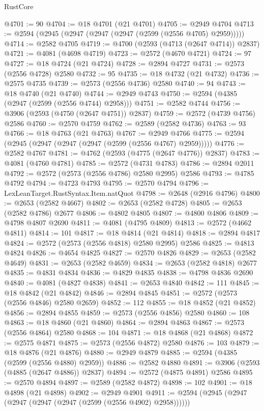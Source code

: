 \begin{lexlean}{RustCore}
\begin{coremodule}
@4701 := 90
@4704 := @18 @4701 (@21 @4701)
@4705 := @2949 @4704
@4713 := @2594 (@2945 (@2947 (@2947 (@2947 (@2599 (@2556 @4705) @2959)))))
@4714 := @2582 @4705
@4719 := @4700 (@2593 (@4713 (@2647 @4714)) @2837)
@4721 := @4081 (@4698 @4719)
@4723 := @2572 (@4670 @4721)
@4724 := 97
@4727 := @18 @4724 (@21 @4724)
@4728 := @2894 @4727
@4731 := @2573 (@2556 @4728) @2580
@4732 := 95
@4735 := @18 @4732 (@21 @4732)
@4736 := @2575 @4735
@4739 := @2573 (@2556 @4736) @2580
@4740 := 94
@4743 := @18 @4740 (@21 @4740)
@4744 := @2949 @4743
@4750 := @2594 (@4385 (@2947 (@2599 (@2556 @4744) @2958)))
@4751 := @2582 @4744
@4756 := @3906 (@2593 (@4750 (@2647 @4751)) @2837)
@4759 := @2572 (@4739 @4756) @2586
@4760 := @2570 @4759
@4762 := @2589 (@2582 @4736)
@4763 := 93
@4766 := @18 @4763 (@21 @4763)
@4767 := @2949 @4766
@4775 := @2594 (@2945 (@2947 (@2947 (@2947 (@2599 (@2556 @4767) @2959)))))
@4776 := @2582 @4767
@4781 := @4762 (@2593 (@4775 (@2647 @4776)) @2837)
@4783 := @4081 (@4760 @4781)
@4785 := @2572 (@4731 @4783)
@4786 := @2894 @2011
@4792 := @2572 (@2573 (@2556 @4786) @2580 @2995) @2586
@4793 := @4785 @4792
@4794 := @4723 @4793
@4795 := @2570 @4794
@4796 := LexLeanTarget.RustSyntax.Item.natQuot
@4798 := @2648 (@2916 @4796)
@4800 := @2653 (@2582 @4667)
@4802 := @2653 (@2582 @4728)
@4805 := @2653 (@2582 @4786) @2677
@4806 := @4802 @4805
@4807 := @4800 @4806
@4809 := @4798 @4807 @2690
@4811 := @4081 (@4795 @4809)
@4813 := @2572 (@4662 @4811)
@4814 := 101
@4817 := @18 @4814 (@21 @4814)
@4818 := @2894 @4817
@4824 := @2572 (@2573 (@2556 @4818) @2580 @2995) @2586
@4825 := @4813 @4824
@4826 := @4654 @4825
@4827 := @2570 @4826
@4829 := @2653 (@2582 @4649)
@4831 := @2653 (@2582 @4659)
@4834 := @2653 (@2582 @4818) @2677
@4835 := @4831 @4834
@4836 := @4829 @4835
@4838 := @4798 @4836 @2690
@4840 := @4081 (@4827 @4838)
@4841 := @2653 @4840
@4842 := 111
@4845 := @18 @4842 (@21 @4842)
@4846 := @2894 @4845
@4851 := @2572 (@2573 (@2556 @4846) @2580 @2659)
@4852 := 112
@4855 := @18 @4852 (@21 @4852)
@4856 := @2894 @4855
@4859 := @2573 (@2556 @4856) @2580
@4860 := 108
@4863 := @18 @4860 (@21 @4860)
@4864 := @2894 @4863
@4867 := @2573 (@2556 @4864) @2580
@4868 := 104
@4871 := @18 @4868 (@21 @4868)
@4872 := @2575 @4871
@4875 := @2573 (@2556 @4872) @2580
@4876 := 103
@4879 := @18 @4876 (@21 @4876)
@4880 := @2949 @4879
@4885 := @2594 (@4385 (@2599 (@2556 @4880) @2959))
@4886 := @2582 @4880
@4891 := @3906 (@2593 (@4885 (@2647 @4886)) @2837)
@4894 := @2572 (@4875 @4891) @2586
@4895 := @2570 @4894
@4897 := @2589 (@2582 @4872)
@4898 := 102
@4901 := @18 @4898 (@21 @4898)
@4902 := @2949 @4901
@4911 := @2594 (@2945 (@2947 (@2947 (@2947 (@2947 (@2599 (@2556 @4902) @2958))))))

\end{coremodule}
\end{lexlean}
